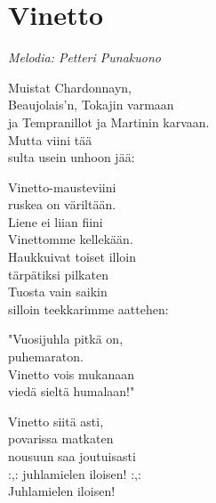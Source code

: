 \section{Vinetto}
\textit{Melodia: Petteri Punakuono}

Muistat Chardonnayn,\\
Beaujolais'n, Tokajin varmaan\\
ja Tempranillot ja Martinin karvaan.\\
Mutta viini tää\\
sulta usein unhoon jää:

Vinetto-mausteviini\\
ruskea on väriltään.\\
Liene ei liian fiini\\
Vinettomme kellekään.\\
Haukkuivat toiset illoin\\
tärpätiksi pilkaten\\
Tuosta vain saikin\\
silloin teekkarimme aattehen:

"Vuosijuhla pitkä on,\\
puhemaraton.\\
Vinetto vois mukanaan\\
viedä sieltä humalaan!"

Vinetto siitä asti,\\
povarissa matkaten\\
nousuun saa joutuisasti\\
:,: juhlamielen iloisen! :,:\\
Juhlamielen iloisen!